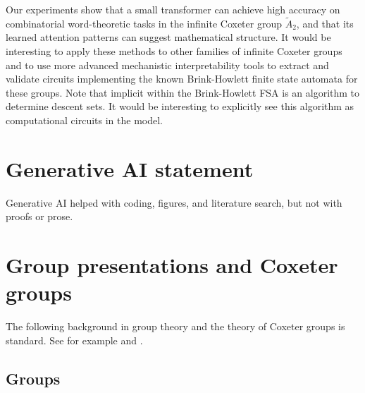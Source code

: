 \documentclass{article}
\begin{document}
Our experiments show that a small transformer can achieve high accuracy on combinatorial word-theoretic tasks in the infinite Coxeter group $\widetilde{A}_2$, and that its learned attention patterns can suggest mathematical structure. It would be interesting to apply these methods to other families of infinite Coxeter groups and to use more advanced mechanistic interpretability tools to extract and validate circuits implementing the known Brink-Howlett finite state automata \citet{Brink1993} for these groups. Note that implicit within the Brink-Howlett FSA is an algorithm to determine descent sets. It would be interesting to explicitly see this algorithm as computational circuits in the model.

\section{Generative AI statement} Generative AI helped with coding, figures, and literature search, but not with proofs or prose.





\appendix
\section{Group presentations and Coxeter groups}\label{app:GroupsandCoxeter}

The following background in group theory and the theory of Coxeter groups is standard. See for example \citet{artin2011algebra} and \citet{BjornerBrentiCoxeter}.

\subsection{Groups} 
\end{document}
